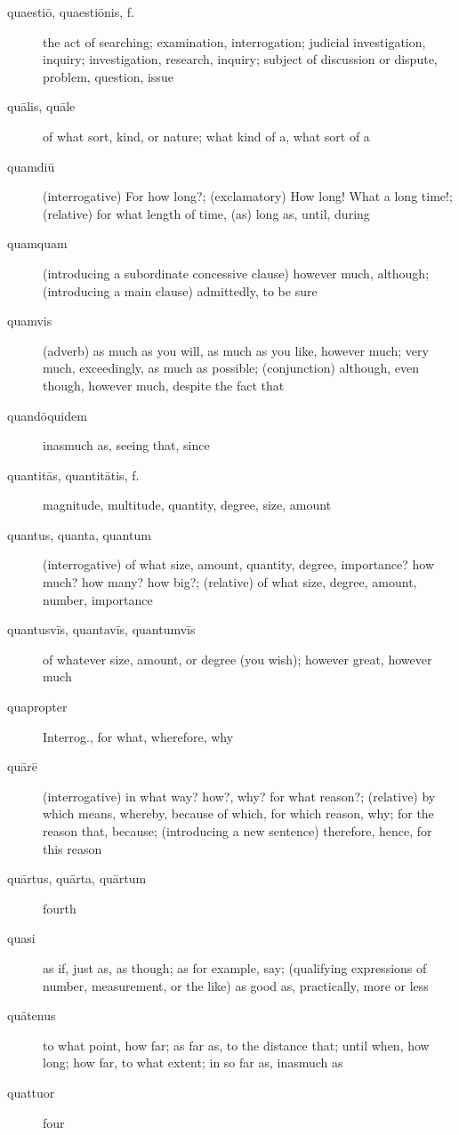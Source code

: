 \begin{description}
    \item[quaestiō, quaestiōnis, f.] the act of searching; examination, interrogation; judicial investigation, inquiry; investigation, research, inquiry; subject of discussion or dispute, problem, question, issue
    \item[quālis, quāle] \marginnote{*}of what sort, kind, or nature; what kind of a, what sort of a
    \item[quamdiū] (interrogative) For how long?; (exclamatory) How long! What a long time!; (relative) for what length of time, (as) long as, until, during
    \item[quamquam] \marginnote{*}(introducing a subordinate concessive clause) however much, although; (introducing a main clause) admittedly, to be sure
    \item[quamvis] (adverb) as much as you will, as much as you like, however much; very much, exceedingly, as much as possible; (conjunction) although, even though, however much, despite the fact that
    \item[quandōquidem] inasmuch as, seeing that, since
    \item[quantitās, quantitātis, f.] magnitude, multitude, quantity, degree, size, amount
    \item[quantus, quanta, quantum] \marginnote{*}(interrogative) of what size, amount, quantity, degree, importance? how much? how many? how big?; (relative) of what size, degree, amount, number, importance
    \item[quantusvīs, quantavīs, quantumvīs] of whatever size, amount, or degree (you wish); however great, however much
    \item[quapropter] Interrog., for what, wherefore, why
    \item[quārē] \marginnote{*}(interrogative) in what way? how?, why? for what reason?; (relative) by which means, whereby, because of which, for which reason, why; for the reason that, because; (introducing a new sentence) therefore, hence, for this reason
    \item[quārtus, quārta, quārtum] fourth
    \item[quasi] \marginnote{*}as if, just as, as though; as for example, say; (qualifying expressions of number, measurement, or the like) as good as, practically, more or less
    \item[quātenus] to what point, how far; as far as, to the distance that; until when, how long; how far, to what extent; in so far as, inasmuch as
    \item[quattuor] \marginnote{*}four

\end{description}
